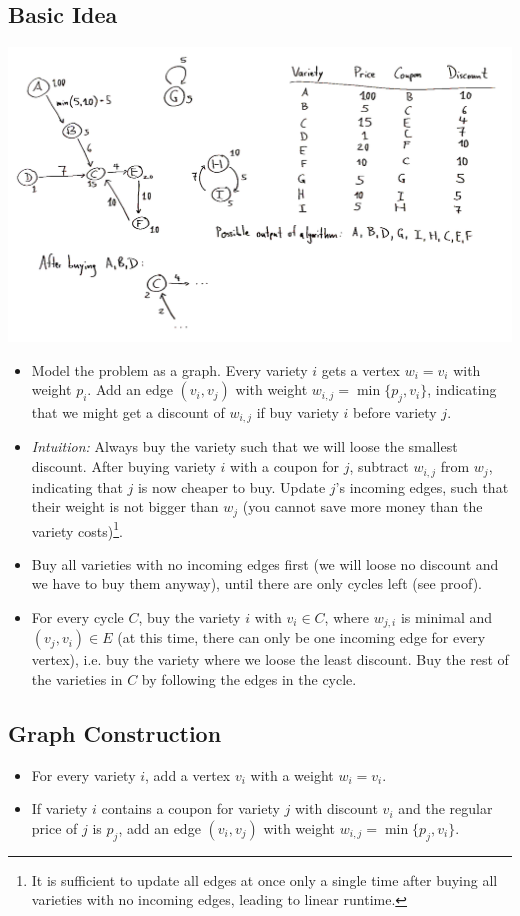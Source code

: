 \documentclass[12pt]{article}
\begin{document}
\subsection*{Basic Idea}
\includegraphics[width=\textwidth]{2_1.pdf}
\begin{itemize}
	\item Model the problem as a graph. Every variety $i$ gets a vertex $w_i = v_i$ with weight $p_i$. Add an edge $(v_i, v_j)$ with weight $w_{i,j} = \min \{p_j, v_i\}$, indicating that we might get a discount of $w_{i,j}$ if buy variety $i$ before variety $j$.
	\item \emph{Intuition:} Always buy the variety such that we will loose the smallest discount. After buying variety $i$ with a coupon for $j$, subtract $w_{i,j}$ from $w_j$, indicating that $j$ is now cheaper to buy. Update $j$'s incoming edges, such that their weight is not bigger than $w_j$ (you cannot save more money than the variety costs)\footnote{It is sufficient to update all edges at once only a single time after buying all varieties with no incoming edges, leading to linear runtime.}.
	\item Buy all varieties with no incoming edges first (we will loose no discount and we have to buy them anyway), until there are only cycles left (see proof).
	\item For every cycle $C$, buy the variety $i$ with $v_i \in C$, where $w_{j, i}$ is minimal and $(v_j, v_i) \in E$ (at this time, there can only be one incoming edge for every vertex), i.e. buy the variety where we loose the least discount. Buy the rest of the varieties in $C$ by following the edges in the cycle.
\end{itemize}

\subsection*{Graph Construction}
\begin{itemize}
	\item For every variety $i$, add a vertex $v_i$ with a weight $w_i = v_i$.
	\item If variety $i$ contains a coupon for variety $j$ with discount $v_i$ and the regular price of $j$ is $p_j$, add an edge $(v_i, v_j)$ with weight $w_{i,j} = \min \{p_j, v_i\}$.
\end{itemize}
\end{document}
